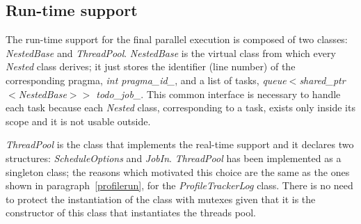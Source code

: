 \documentclass[a4paper,12pt,oneside]{book}
\begin{document}

\subsection{Run-time support}
\label{runtime}
The run-time support for the final parallel execution is composed of two classes: \emph{NestedBase} and \emph{ThreadPool}. \emph{NestedBase} is the virtual class from which every \emph{Nested} class derives; it just stores the identifier (line number) of the corresponding pragma, \emph{int pragma\_id\_}, and a list of tasks, \emph{queue$<$shared\_ptr$<$NestedBase$>>$ todo\_job\_}. This common interface is necessary to handle each task because each \emph{Nested} class, corresponding to a task, exists only inside its scope and it is not usable outside.   

\emph{ThreadPool} is the class that implements the real-time support and it declares two structures: \emph{ScheduleOptions} and \emph{JobIn}. \emph{ThreadPool} has been implemented as a singleton class; the reasons which motivated this choice are the same as the ones shown in paragraph~\ref{profilerun}, for the \emph{ProfileTrackerLog} class. There is no need to protect the instantiation of the class with mutexes given that it is the constructor of this class that instantiates the threads pool.
\end{document}

